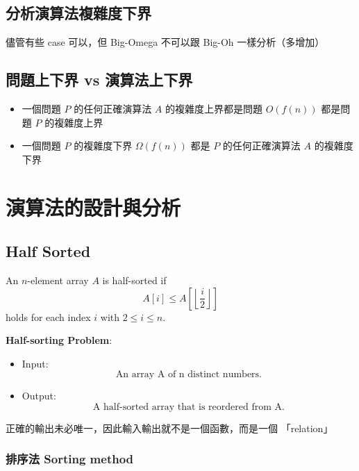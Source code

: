 \section{分析演算法複雜度下界}

儘管有些 case 可以，但 Big-Omega 不可以跟 Big-Oh 一樣分析（多增加）

\begin{remark}
\end{remark}

\section{問題上下界 vs 演算法上下界}
\begin{itemize}
    \item 一個問題 $P$ 的任何正確演算法 $A$ 的複雜度上界都是問題 $O(f(n))$ 都是問題 $P$ 的複雜度上界
    \item 一個問題 $P$ 的複雜度下界 $\Omega(f(n))$ 都是 $P$ 的任何正確演算法 $A$ 的複雜度下界
\end{itemize}


\chapter{演算法的設計與分析}

\section{Half Sorted}
\begin{definition}
    An $n$-element array $A$ is half-sorted if
    \[
        A[i] \leq A\left[ \left\lfloor \frac{i}{2} \right\rfloor \right]
    \]
    holds for each index $i$ with $2 \leq i \leq n$.
\end{definition}

\textbf{Half-sorting Problem}:
\begin{itemize}
    \item Input: \[
        \text{An array A of n distinct numbers.}
    \]
    \item Output: \[
        \text{A half-sorted array that is reordered from A.}
    \]
\end{itemize}
\begin{note}
    正確的輸出未必唯一，因此輸入輸出就不是一個函數，而是一個 「relation」
\end{note}

\subsection{排序法 Sorting method}

